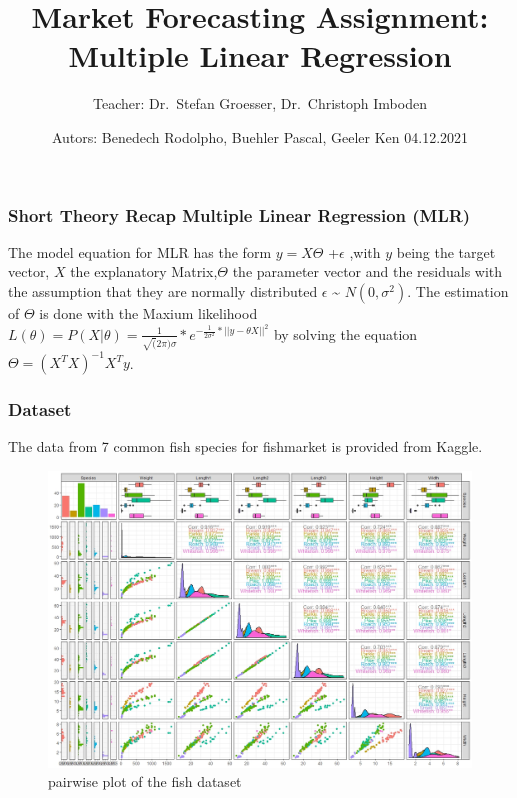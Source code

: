 \documentclass[
]{article}
\title{Market Forecasting Assignment: Multiple Linear Regression}
\author{Teacher: Dr.~Stefan Groesser, Dr.~Christoph Imboden}
\date{Autors: Benedech Rodolpho, Buehler Pascal, Geeler Ken 04.12.2021}
\begin{document}
\maketitle

\hypertarget{short-theory-recap-multiple-linear-regression-mlr}{%
\subsubsection{Short Theory Recap Multiple Linear Regression
(MLR)}\label{short-theory-recap-multiple-linear-regression-mlr}}

The model equation for MLR has the form \(y=X\Theta\) +\(\epsilon\)
,with \(y\) being the target vector, \(X\) the explanatory
Matrix,\(\Theta\) the parameter vector and the residuals with the
assumption that they are normally distributed \(\epsilon\)
\textasciitilde{} \(N(0,\sigma^{2})\). The estimation of \(\Theta\) is
done with the Maxium likelihood
\(L(\theta)=P(X|\theta)=\frac{1}{\sqrt(2\pi)\sigma}*e^{-\frac{1}{2\sigma^{2}}*||y-\theta X||^{2}}\)
by solving the equation \(\Theta=(X^{T}X)^{-1}X^{T}y\).

\hypertarget{dataset}{%
\subsubsection{Dataset}\label{dataset}}

The data from 7 common fish species for fishmarket is provided from
Kaggle.

\begin{figure}

{\centering \includegraphics[width=0.95\linewidth]{fish_pairs} 

}

\caption{pairwise plot of the fish dataset}\label{fig:pairwise}
\end{figure}
\end{document}
